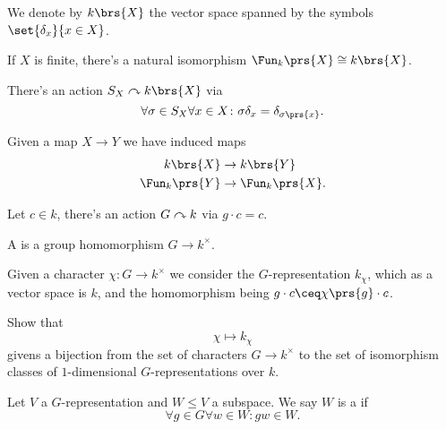 \documentclass[10pt,a4paper,twoside,openany,hidelinks]{book}
\begin{document}
\begin{notation}
We denote by $k\brs{X}$ the vector space spanned by the symbols $\set{\delta_x}{x \in X}$.
\end{notation}

\begin{remark}
If $X$ is finite, there's a natural isomorphism $\Fun_k\prs{X} \cong k\brs{X}$.
\end{remark}

\begin{remark}
There's an action $S_X \acts k\brs{X}$ via
\[\forall \sigma \in S_X \forall x \in X \colon \sigma \delta_x = \delta_{\sigma\prs{x}} \text{.}\]
\end{remark}

\begin{remark}
Given a map $X \to Y$ we have induced maps
\begin{align*}
k\brs{X} &\to k\brs{Y} \\
\Fun_k\prs{Y} &\to \Fun_k\prs{X} \text{.}
\end{align*}
\end{remark}

\begin{example}
Let $c \in k$, there's an action $G \curvearrowright k$ via $g \cdot c = c$.
\end{example}

\begin{definition}[Character]
A  is a group homomorphism $G \to k^\times$.
\end{definition}

\begin{notation}
Given a character $\chi \colon G \to k^\times$ we consider the $G$-representation $k_\chi$, which as a vector space is $k$, and the homomorphism being
$g \cdot c \ceq \chi\prs{g} \cdot c$.
\end{notation}

\begin{exercise}
Show that \[\chi \mapsto k_\chi\]
givens a bijection from the set of characters $G \to k^\times$ to the set of isomorphism classes of $1$-dimensional $G$-representations over $k$.
\end{exercise}

\begin{definition}[$G$-Subrepresentation]
Let $V$ a $G$-representation and $W \leq V$ a subspace. We say $W$ is a  if
\[\forall g \in G \forall w \in W \colon gw \in W \text{.}\]
\end{definition}
\end{document}
